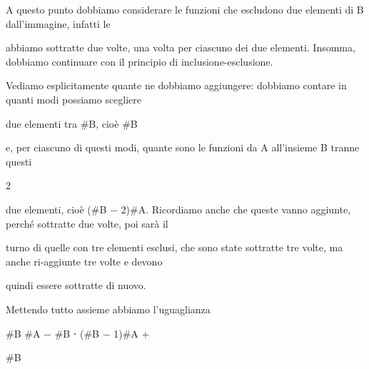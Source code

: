 \documentclass[a4paper,portrait,12pt]{article}
\begin{document}
\begin{flushleft}
A questo punto dobbiamo considerare le funzioni che escludono due elementi di B dall'immagine, infatti le
\end{flushleft}


\begin{flushleft}
abbiamo sottratte due volte, una volta per ciascuno dei due elementi. Insomma, dobbiamo continuare con il principio di inclusione-esclusione.
\end{flushleft}


\begin{flushleft}
Vediamo esplicitamente quante ne dobbiamo aggiungere: dobbiamo contare in quanti modi possiamo scegliere
\end{flushleft}


\begin{flushleft}
due elementi tra \#B, cio\`{e} \#B
\end{flushleft}


\begin{flushleft}
e, per ciascuno di questi modi, quante sono le funzioni da A all'insieme B tranne questi
\end{flushleft}


2


\begin{flushleft}
due elementi, cio\`{e} (\#B $-$ 2)\#A. Ricordiamo anche che queste vanno aggiunte, perch\'{e} sottratte due volte, poi sar\`{a} il
\end{flushleft}


\begin{flushleft}
turno di quelle con tre elementi esclusi, che sono state sottratte tre volte, ma anche ri-aggiunte tre volte e devono
\end{flushleft}


\begin{flushleft}
quindi essere sottratte di nuovo.
\end{flushleft}


\begin{flushleft}
Mettendo tutto assieme abbiamo l'uguaglianza
\end{flushleft}


\begin{flushleft}
\#B \#A $-$ \#B ⋅ (\#B $-$ 1)\#A +
\end{flushleft}





\begin{flushleft}
\#B
\end{flushleft}
\end{document}

